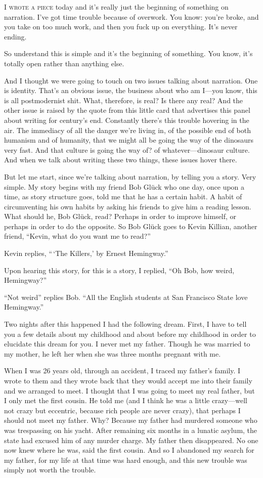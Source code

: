 \documentclass[
]{memoir}
\begin{document}
\lettrine[lines=3, findent=0em, nindent=0.1em, lhang=0]{I}{ wrote a piece}
today and it's really just the beginning of something on narration. I've
got time trouble because of overwork. You know: you're broke, and you
take on too much work, and then you fuck up on everything. It's never
ending.

So understand this is simple and it's the beginning of something. You
know, it's totally open rather than anything else.

And I thought we were going to touch on two issues talking about
narration. One is identity. That's an obvious issue, the business about
who am I---you know, this is all postmodernist shit. What, therefore, is
real? Is there any real? And the other issue is raised by the quote from
this little card that advertises this panel about writing for century's
end. Constantly there's this trouble hovering in the air. The immediacy
of all the danger we're living in, of the possible end of both humanism
and of humanity, that we might all be going the way of the dinosaurs
very fast. And that culture is going the way of? of whatever---dinosaur
culture. And when we talk about writing these two things, these issues
hover there.

But let me start, since we're talking about narration, by telling you a
story. Very simple. My story begins with my friend Bob Glück who one
day, once upon a time, as story structure goes, told me that he has a
certain habit. A habit of circumventing his own habits by asking his
friends to give him a reading lesson. What should he, Bob Glück, read?
Perhaps in order to improve himself, or perhaps in order to do the
opposite. So Bob Glück goes to Kevin Killian, another friend, ``Kevin,
what do you want me to read?''

Kevin replies, ``\,`The Killers,' by Ernest Hemingway.''

Upon hearing this story, for this is a story, I replied, ``Oh Bob, how
weird, Hemingway?''

``Not weird'' replies Bob. ``All the English students at San Francisco
State love Hemingway.''

Two nights after this happened I had the following dream. First, I have
to tell you a few details about my childhood and about before my
childhood in order to elucidate this dream for you. I never met my
father. Though he was married to my mother, he left her when she was
three months pregnant with me.

When I was 26 years old, through an accident, I traced my father's
family. I wrote to them and they wrote back that they would accept me
into their family and we arranged to meet. I thought that I was going to
meet my real father, but I only met the first cousin. He told me (and I
think he was a little crazy---well not crazy but eccentric, because rich
people are never crazy), that perhaps I should not meet my father. Why?
Because my father had murdered someone who was trespassing on his yacht.
After remaining six months in a lunatic asylum, the state had excused
him of any murder charge. My father then disappeared. No one now knew
where he was, said the first cousin. And so I abandoned my search for my
father, for my life at that time was hard enough, and this new trouble
was simply not worth the trouble.
\end{document}
